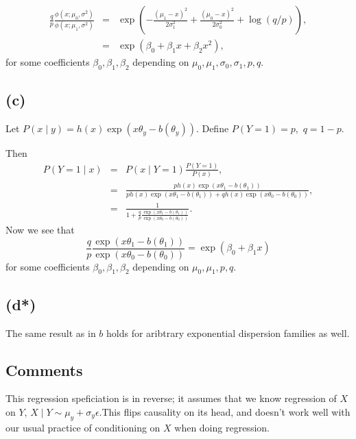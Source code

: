 \begin{eqnarray*}
\frac{q}{p}\frac{\phi(x;\mu_{0},\sigma^{2})}{\phi(x;\mu_{1},\sigma^{2})} & = & \exp\left(-\frac{(\mu_{1}-x)^{2}}{2\sigma_{1}^{2}}+\frac{(\mu_{0}-x)^{2}}{2\sigma_{0}^{2}}+\log(q/p)\right),\\
 & = & \exp\left(\beta_{0}+\beta_{1}x+\beta_{2}x^{2}\right),
\end{eqnarray*}
for some coefficients $\beta_{0},\beta_{1},\beta_{2}$ depending on
$\mu_{0},\mu_{1},\sigma_{0},\sigma_{1},p,q$.

\subsection*{(c)}

Let $P(x\mid y)=h(x)\exp(x\theta_{y}-b(\theta_{y}))$. Define $P(Y=1)=p,$
$q=1-p$. 

Then 
\begin{eqnarray*}
P(Y=1\mid x) & = & P(x\mid Y=1)\frac{P(Y=1)}{P(x)},\\
 & = & \frac{ph(x)\exp(x\theta_{1}-b(\theta_{1}))}{ph(x)\exp(x\theta_{1}-b(\theta_{1}))+qh(x)\exp(x\theta_{0}-b(\theta_{0}))},\\
 & = & \frac{1}{1+\frac{q}{p}\frac{\exp(x\theta_{1}-b(\theta_{1}))}{\exp(x\theta_{0}-b(\theta_{0}))}}.
\end{eqnarray*}
Now we see that
\[
\frac{q}{p}\frac{\exp(x\theta_{1}-b(\theta_{1}))}{\exp(x\theta_{0}-b(\theta_{0}))}=\exp\left(\beta_{0}+\beta_{1}x\right)
\]
for some coefficients $\beta_{0},\beta_{1},\beta_{2}$ depending on
$\mu_{0},\mu_{1},p,q$. 

\subsection*{(d{*})}

The same result as in $b$ holds for aribtrary exponential dispersion
families as well. 

\subsection*{Comments}

This regression speficiation is in reverse; it assumes that we know
regression of $X$ on $Y$, $X\mid Y\sim\mu_{y}+\sigma_{y}\epsilon$.This
flips causality on its head, and doesn't work well with our usual
practice of conditioning on $X$ when doing regression.
